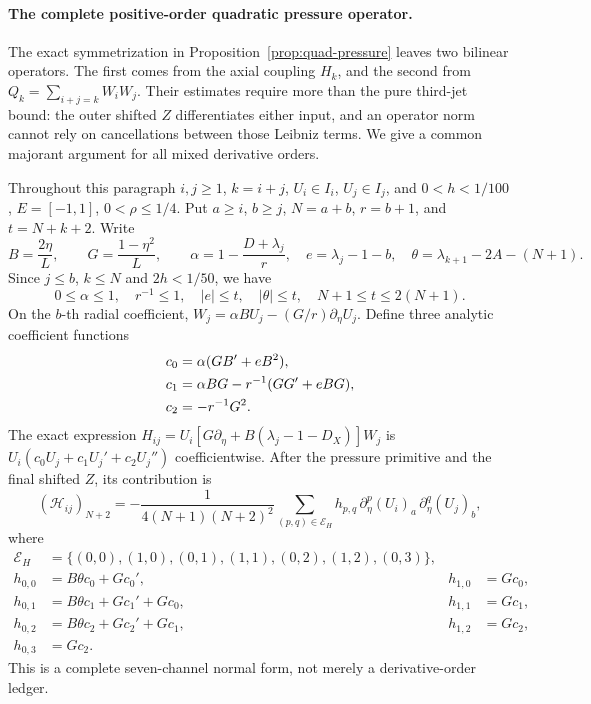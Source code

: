 \paragraph{The complete positive-order quadratic pressure operator.}
The exact symmetrization in Proposition~\ref{prop:quad-pressure} leaves two bilinear operators. The first comes from the axial coupling $H_k$, and the second from $Q_k=\sum_{i+j=k}W_iW_j$. Their estimates require more than the pure third-jet bound: the outer shifted $Z$ differentiates either input, and an operator norm cannot rely on cancellations between those Leibniz terms. We give a common majorant argument for all mixed derivative orders.

Throughout this paragraph $i,j\ge1$, $k=i+j$, $U_i\in I_i$, $U_j\in I_j$, and $0<h<1/100$, $E=[-1,1]$, $0<\rho\le1/4$. Put $a\ge i$, $b\ge j$, $N=a+b$, $r=b+1$, and $t=N+k+2$. Write
\[
 B=\frac{2\eta}{L},\qquad G=\frac{1-\eta^2}{L},\qquad
 \alpha=1-\frac{D+\lambda_j}{r},\quad
 e=\lambda_j-1-b,\quad\theta=\lambda_{k+1}-2A-(N+1).
\]
Since $j\le b$, $k\le N$ and $2h<1/50$, we have
\begin{equation}\label{eq:bilinear-index}
 0\le\alpha\le1,\quad r^{-1}\le1,\quad
 |e|\le t,\quad |\theta|\le t,\quad
 N+1\le t\le2(N+1).
\end{equation}
On the $b$-th radial coefficient, $W_j=\alpha B U_j-(G/r)\partial_\eta U_j$. Define three analytic coefficient functions
\begin{align}\label{eq:bilinear-c}
 c_0&=\alpha(GB'+eB^2),\\
 c_1&=\alpha BG-r^{-1}(GG'+eBG),\notag\\
 c_2&=-r^{-1}G^2.\notag
\end{align}
The exact expression $H_{ij}=U_i[G\partial_\eta+B(\lambda_j-1-D_X)]W_j$ is
$U_i(c_0U_j+c_1U_j'+c_2U_j'')$ coefficientwise. After the pressure primitive and the final shifted $Z$, its contribution is
\begin{equation}\label{eq:H-composite}
 (\mathcal H_{ij})_{N+2}=-\frac1{4(N+1)(N+2)^2}
 \sum_{(p,q)\in\mathcal E_H} h_{p,q}\,\partial_\eta^p(U_i)_a\,\partial_\eta^q(U_j)_b,
\end{equation}
where
\begin{align*}
\mathcal E_H&=\{(0,0),(1,0),(0,1),(1,1),(0,2),(1,2),(0,3)\},\\
h_{0,0}&=B\theta c_0+Gc_0',&h_{1,0}&=Gc_0,\\
h_{0,1}&=B\theta c_1+Gc_1'+Gc_0,&h_{1,1}&=Gc_1,\\
h_{0,2}&=B\theta c_2+Gc_2'+Gc_1,&h_{1,2}&=Gc_2,\\
h_{0,3}&=Gc_2.
\end{align*}
This is a complete seven-channel normal form, not merely a derivative-order ledger.

